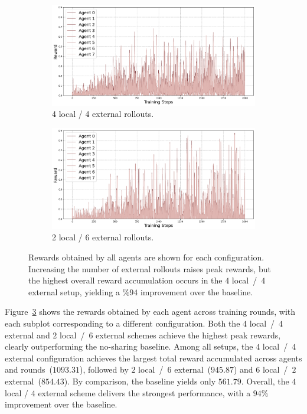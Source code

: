 \documentclass[11pt, a4paper, logo, singlecolumn, copyright]{gensyn}
\begin{document}
\begin{figure}[ht]
    \begin{subfigure}{0.49\textwidth}
        \centering
        \includegraphics[width=\linewidth]{figures/SAPO_rewards_4loc4ext_gensyn.png}
        \caption{4 local / 4 external rollouts.}
        \label{fig:raw_rewards44}
    \end{subfigure}
    \hfill
    \begin{subfigure}{0.49\textwidth}
        \centering
        \includegraphics[width=\linewidth]{figures/SAPO_rewards_2loc6ext_gensyn.png}
        \caption{2 local / 6 external rollouts.}
        \label{fig:raw_rewards26}
    \end{subfigure}

    \caption{Rewards obtained by all agents are shown for each configuration. Increasing the number of external rollouts raises peak rewards, but the highest overall reward accumulation occurs in the $4$ local~/~$4$ external setup, yielding a $\%94$ improvement over the baseline.}
    \label{fig:raw_rewards}
\end{figure}

Figure~\ref{fig:raw_rewards} shows the rewards obtained by each agent across training rounds, with each subplot corresponding to a different configuration. Both the $4$ local~/~$4$ external and $2$ local~/~$6$ external schemes achieve the highest peak rewards, clearly outperforming the no-sharing baseline. Among all setups, the $4$ local~/~$4$ external configuration achieves the largest total reward accumulated across agents and rounds~($1093.31$), followed by $2$ local~/~$6$ external~($945.87$) and $6$ local~/~$2$ external~($854.43$). By comparison, the baseline yields only $561.79$. Overall, the $4$ local / $4$ external scheme delivers the strongest performance, with a $94\%$ improvement over the baseline.
\end{document}
